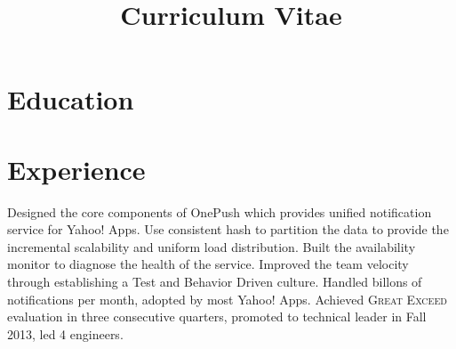 \documentclass[11pt,a4paper,sans]{moderncv} %
\title{Curriculum Vitae}
\begin{document}
\makecvtitle %


\vspace{-1.0\baselineskip}
\section{Education}


\section{Experience}


{
Designed the core components of OnePush which provides unified notification service for Yahoo! Apps. Use consistent hash to partition the data to provide the incremental scalability and uniform load distribution. Built the availability monitor to diagnose the health of the service. Improved the team velocity through establishing a Test and Behavior Driven culture.
\newline{}\newline{}
Handled billons of notifications per month, adopted by most Yahoo! Apps.\newline{}
Achieved \textsc{Great Exceed} evaluation in three consecutive quarters, promoted to technical leader in Fall 2013, led 4 engineers.
}


\end{document}
